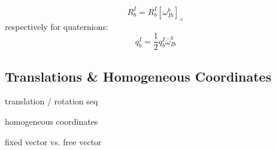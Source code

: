 \documentclass[a4paper]{paper}
\begin{document}
\begin{equation}
    \dot {R_b^I} = R_b^I [\omega^b_{Ib}]_{\times}
\end{equation}
respectively for quaternions:
\begin{equation}
    \dot {q_b^I} = \frac{1}{2} q_b^I \bar\omega^b_{Ib}
\label{eq:rotation_qdot}
\end{equation}



\subsection{Translations \& Homogeneous Coordinates}

translation / rotation seq

homogeneous coordinates

fixed vector vs. free vector
\end{document}

